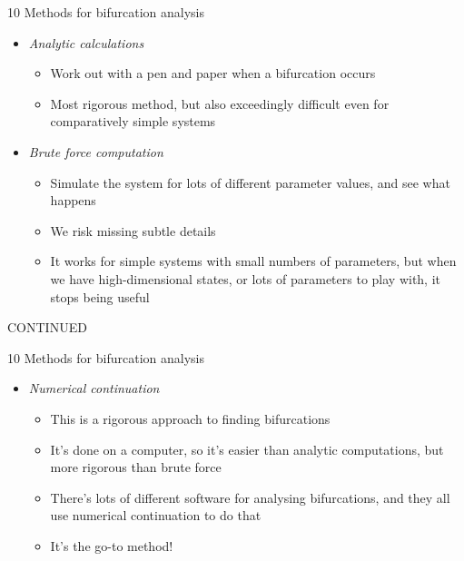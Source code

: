 \documentclass[presentation]{beamer}
\begin{document}
\begin{frame}[label={sec:org35936a6}]{10 Methods for bifurcation analysis}
\begin{itemize}
\item \emph{Analytic calculations}
\begin{itemize}
\item Work out with a pen and paper when a bifurcation occurs
\item Most rigorous method, but also exceedingly difficult even for comparatively simple systems
\end{itemize}
\item \emph{Brute force computation}
\begin{itemize}
\item Simulate the system for lots of different parameter values, and see what happens
\item We risk missing subtle details
\item It works for simple systems with small numbers of parameters, but when we have high-dimensional states, or lots of parameters to play with, it stops being useful

\vfill
\end{itemize}
\end{itemize}
CONTINUED 
\end{frame}

\begin{frame}[label={sec:org43896bf}]{10 Methods for bifurcation analysis}
\begin{itemize}
\item \emph{Numerical continuation}
\begin{itemize}
\item This is a rigorous approach to finding bifurcations
\item It's done on a computer, so it's easier than analytic computations, but more rigorous than brute force
\item There's lots of different software for analysing bifurcations, and they all use numerical continuation to do that
\item It's the go-to method!
\end{itemize}
\end{itemize}
\end{frame}
\end{document}
